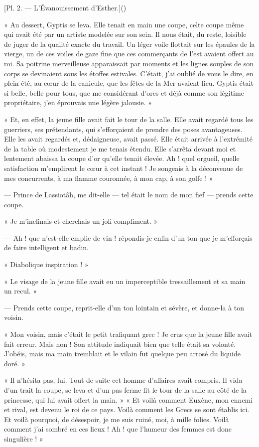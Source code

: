\documentclass[a4paper, 11pt, oneside, polutonikogreek, french]{article}
\begin{document}
[Pl. 2. --- L'Évanouissement d'Esther.]()

« Au dessert, Gyptis se leva. Elle tenait en main une coupe, celte coupe même qui avait été par un artiste modelée sur son sein. Il nous était, du reste, loisible de juger de la qualité exacte du travail. Un léger voile flottait sur les épaules de la vierge, un de ces voiles de gaze fine que ces commerçants de l'est avaient offert au roi. Sa poitrine merveilleuse apparaissait par moments et les lignes souples de son corps se devinaient sous les étoffes estivales. C'était, j'ai oublié de vous le dire, en plein été, au cœur de la canicule, que les fêtes de la Mer avaient lieu. Gyptis était si belle, belle pour tous, que me considérant d'ores et déjà comme son légitime propriétaire, j'en éprouvais une légère jalousie. »

« Et, en effet, la jeune fille avait fait le tour de la salle. Elle avait regardé tous les guerriers, ses prétendants, qui s'efforçaient de prendre des poses avantageuses. Elle les avait regardés et, dédaigneuse, avait passé. Elle était arrivée à l'extrémité de la table où modestement je me tenais étendu. Elle s'arrêta devant moi et lentement abaissa la coupe d'or qu'elle tenait élevée. Ah ! quel orgueil, quelle satisfaction m'emplirent le cœur à cet instant ! Je songeais à la déconvenue de mes concurrents, à ma flamme couronnée, à mon cap, à son golfe ! »

--- Prince de Lassiotâh, me dit-elle --- tel était le nom de mon fief --- prends cette coupe.

« Je m'inclinais et cherchais un joli compliment. »

--- Ah ! que n'est-elle emplie de vin ! répondis-je enfin d'un ton que je m'efforçais de faire intelligent et badin.

« Diabolique inspiration ! »

« Le visage de la jeune fille avait eu un imperceptible tressaillement et sa main un recul. »

--- Prends cette coupe, reprit-elle d'un ton lointain et sévère, et donne-la à ton voisin.

« Mon voisin, mais c'était le petit trafiquant grec ! Je crus que la jeune fille avait fait erreur. Mais non ! Son attitude indiquait bien que telle était sa volonté. J'obéis, mais ma main tremblait et le vilain fut quelque peu arrosé du liquide doré. »

« Il n'hésita pas, lui. Tout de suite cet homme d'affaires avait compris. Il vida d'un trait la coupe, se leva et d'un pas ferme fit le tour de la salle au côté de la princesse, qui lui avait offert la main. »
 «  Et voilà comment Euxène, mon ennemi et rival, est devenu le roi de ce pays. Voilà comment les Grecs se sont établis ici. Et voilà pourquoi, de désespoir, je me suis ruiné, moi, à mille folies. Voilà comment j'ai sombré en ces lieux ! Ah ! que l'humeur des femmes est donc singulière ! »
\end{document}
